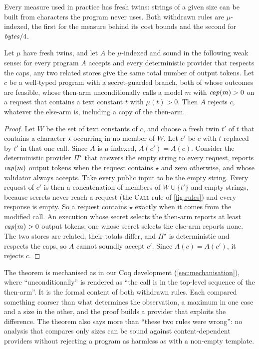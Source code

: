 Every measure used in practice has fresh twins: strings of a given size can be
built from characters the program never uses. Both withdrawn rules are
$\mu$-indexed, the first for the measure behind its cost bounds and the second for
$\mathit{bytes}/4$.

\begin{theorem}\label{thm:size-blind}
Let $\mu$ have fresh twins, and let $A$ be $\mu$-indexed and sound in the following
weak sense: for every program $A$ accepts and every deterministic provider that
respects the caps, any two related stores give the same total number of output
tokens. Let $c$ be a well-typed program with a secret-guarded branch, both of whose
outcomes are feasible, whose then-arm unconditionally calls a model $m$ with
$\mathit{cap}(m) > 0$ on a request that contains a text constant $t$ with $\mu(t) > 0$.
Then $A$ rejects $c$, whatever the else-arm is, including a copy of the then-arm.
\end{theorem}

\begin{proof}
Let $W$ be the set of text constants of $c$, and choose a fresh twin $t'$ of $t$
that contains a character $\star$ occurring in no member of $W$. Let $c'$ be $c$
with $t$ replaced by $t'$ in that one call. Since $A$ is $\mu$-indexed,
$A(c') = A(c)$. Consider the deterministic provider $\Pi^\star$ that answers the empty
string to every request, reports $\mathit{cap}(m)$ output tokens when the request contains
$\star$ and zero otherwise, and whose validator always accepts. Take every public
input to be the empty string. Every request of $c'$ is then a concatenation of
members of $W \cup \{t'\}$ and empty strings, because secrets never reach a request
(the \textsc{Call} rule of \cref{fig:rules}) and every response is empty. So a
request contains $\star$ exactly when it comes from the modified call. An execution
whose secret selects the then-arm reports at least $\mathit{cap}(m) > 0$ output tokens;
one whose secret selects the else-arm reports none. The two stores are related,
their totals differ, and $\Pi^\star$ is deterministic and respects the caps, so $A$
cannot soundly accept $c'$. Since $A(c) = A(c')$, it rejects $c$.
\end{proof}

The theorem is mechanised as  in our Coq development
(\cref{sec:mechanisation}), where ``unconditionally'' is rendered as ``the call is in
the top-level sequence of the then-arm''. It is the formal content of both
withdrawn rules. Each compared something coarser than what determines the
observation, a maximum in one case and a size in the other, and the proof builds a
provider that exploits the difference. The theorem also says more than ``these two
rules were wrong'': no analysis that compares only sizes can be sound against
content-dependent providers without rejecting a program as harmless as
 with a non-empty template.


